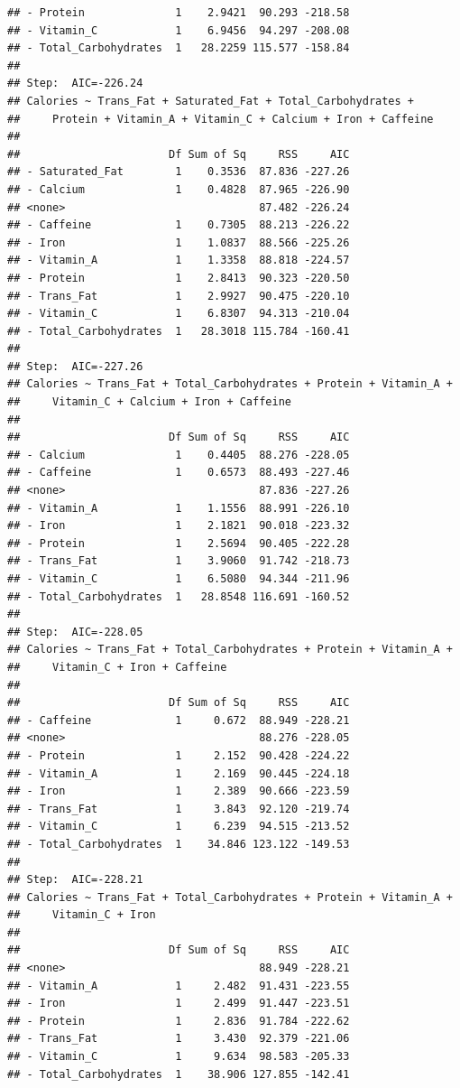 \documentclass[
]{article}
\begin{document}
\begin{verbatim}
## - Protein              1    2.9421  90.293 -218.58
## - Vitamin_C            1    6.9456  94.297 -208.08
## - Total_Carbohydrates  1   28.2259 115.577 -158.84
## 
## Step:  AIC=-226.24
## Calories ~ Trans_Fat + Saturated_Fat + Total_Carbohydrates + 
##     Protein + Vitamin_A + Vitamin_C + Calcium + Iron + Caffeine
## 
##                       Df Sum of Sq     RSS     AIC
## - Saturated_Fat        1    0.3536  87.836 -227.26
## - Calcium              1    0.4828  87.965 -226.90
## <none>                              87.482 -226.24
## - Caffeine             1    0.7305  88.213 -226.22
## - Iron                 1    1.0837  88.566 -225.26
## - Vitamin_A            1    1.3358  88.818 -224.57
## - Protein              1    2.8413  90.323 -220.50
## - Trans_Fat            1    2.9927  90.475 -220.10
## - Vitamin_C            1    6.8307  94.313 -210.04
## - Total_Carbohydrates  1   28.3018 115.784 -160.41
## 
## Step:  AIC=-227.26
## Calories ~ Trans_Fat + Total_Carbohydrates + Protein + Vitamin_A + 
##     Vitamin_C + Calcium + Iron + Caffeine
## 
##                       Df Sum of Sq     RSS     AIC
## - Calcium              1    0.4405  88.276 -228.05
## - Caffeine             1    0.6573  88.493 -227.46
## <none>                              87.836 -227.26
## - Vitamin_A            1    1.1556  88.991 -226.10
## - Iron                 1    2.1821  90.018 -223.32
## - Protein              1    2.5694  90.405 -222.28
## - Trans_Fat            1    3.9060  91.742 -218.73
## - Vitamin_C            1    6.5080  94.344 -211.96
## - Total_Carbohydrates  1   28.8548 116.691 -160.52
## 
## Step:  AIC=-228.05
## Calories ~ Trans_Fat + Total_Carbohydrates + Protein + Vitamin_A + 
##     Vitamin_C + Iron + Caffeine
## 
##                       Df Sum of Sq     RSS     AIC
## - Caffeine             1     0.672  88.949 -228.21
## <none>                              88.276 -228.05
## - Protein              1     2.152  90.428 -224.22
## - Vitamin_A            1     2.169  90.445 -224.18
## - Iron                 1     2.389  90.666 -223.59
## - Trans_Fat            1     3.843  92.120 -219.74
## - Vitamin_C            1     6.239  94.515 -213.52
## - Total_Carbohydrates  1    34.846 123.122 -149.53
## 
## Step:  AIC=-228.21
## Calories ~ Trans_Fat + Total_Carbohydrates + Protein + Vitamin_A + 
##     Vitamin_C + Iron
## 
##                       Df Sum of Sq     RSS     AIC
## <none>                              88.949 -228.21
## - Vitamin_A            1     2.482  91.431 -223.55
## - Iron                 1     2.499  91.447 -223.51
## - Protein              1     2.836  91.784 -222.62
## - Trans_Fat            1     3.430  92.379 -221.06
## - Vitamin_C            1     9.634  98.583 -205.33
## - Total_Carbohydrates  1    38.906 127.855 -142.41
\end{verbatim}
\end{document}

